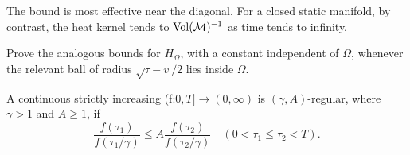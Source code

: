 \begin{remark}
\label{rem:chow-iii-rough-upper-bound-interpretation}


The bound is most effective near the diagonal.  For a closed static manifold,
by contrast, the heat kernel tends to \(\operatorname{Vol}(\mathcal M)^{-1}\) as time tends
to infinity.
\end{remark}

\begin{claim}
\label{clm:chow-iii-rough-dirichlet-upper-bound-exercise}


Prove the analogous bounds for \(H_\Omega\), with a constant independent of
\(\Omega\), whenever the relevant ball of radius \(\sqrt{\tau-v}/2\) lies
inside \(\Omega\).
\end{claim}

\begin{definition}
\label{def:chow-iii-gamma-a-regular-function}

A continuous strictly increasing (f:\(0,T]\to(0,\infty)\) is
\((\gamma,A)\)-regular, where \(\gamma>1\) and \(A\ge1\), if
\[
 \frac{f(\tau_1)}{f(\tau_1/\gamma)}\le
 A\frac{f(\tau_2)}{f(\tau_2/\gamma)}
 \quad(0<\tau_1\le\tau_2<T).
\]
\end{definition}


